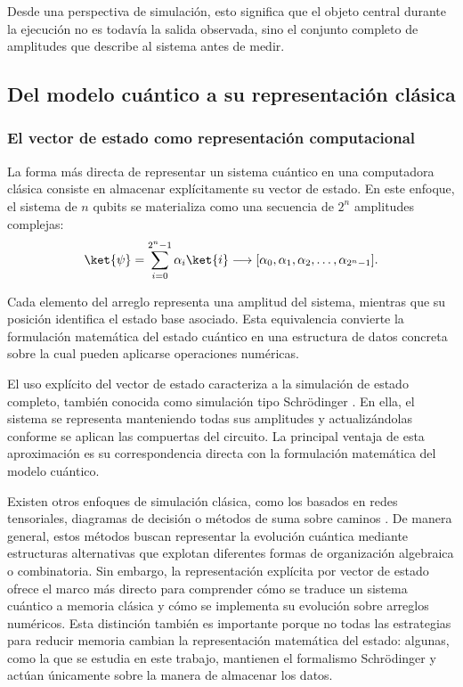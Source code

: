 Desde una perspectiva de simulación, esto significa que el objeto central durante la ejecución no es todavía la salida observada, sino el conjunto completo de amplitudes que describe al sistema antes de medir.

\subsection{\normalsize{Del modelo cuántico a su representación clásica}}

\subsubsection{El vector de estado como representación computacional}

La forma más directa de representar un sistema cuántico en una computadora clásica consiste en almacenar explícitamente su vector de estado. En este enfoque, el sistema de $n$ qubits se materializa como una secuencia de $2^n$ amplitudes complejas:
\[
    \ket{\psi} = \sum_{i=0}^{2^n-1} \alpha_i \ket{i}
    \longrightarrow
    [\alpha_0,\alpha_1,\alpha_2,\ldots,\alpha_{2^n-1}].
\]

Cada elemento del arreglo representa una amplitud del sistema, mientras que su posición identifica el estado base asociado. Esta equivalencia convierte la formulación matemática del estado cuántico en una estructura de datos concreta sobre la cual pueden aplicarse operaciones numéricas.

El uso explícito del vector de estado caracteriza a la simulación de estado completo, también conocida como simulación tipo Schr\"odinger \cite{Jones2019}. En ella, el sistema se representa manteniendo todas sus amplitudes y actualizándolas conforme se aplican las compuertas del circuito. La principal ventaja de esta aproximación es su correspondencia directa con la formulación matemática del modelo cuántico.

Existen otros enfoques de simulación clásica, como los basados en redes tensoriales, diagramas de decisión o métodos de suma sobre caminos \cite{Vidal2003,Viamontes2003,Chen2018}. De manera general, estos métodos buscan representar la evolución cuántica mediante estructuras alternativas que explotan diferentes formas de organización algebraica o combinatoria. Sin embargo, la representación explícita por vector de estado ofrece el marco más directo para comprender cómo se traduce un sistema cuántico a memoria clásica y cómo se implementa su evolución sobre arreglos numéricos. Esta distinción también es importante porque no todas las estrategias para reducir memoria cambian la representación matemática del estado: algunas, como la que se estudia en este trabajo, mantienen el formalismo Schr\"odinger y actúan únicamente sobre la manera de almacenar los datos.

